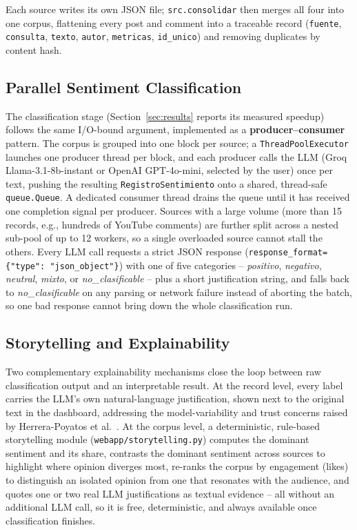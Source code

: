 \documentclass[runningheads]{llncs}
\begin{document}
Each source writes its own JSON file; \texttt{src.consolidar} then merges
all four into one corpus, flattening every post and comment into a
traceable record (\texttt{fuente}, \texttt{consulta}, \texttt{texto},
\texttt{autor}, \texttt{metricas}, \texttt{id\_unico}) and removing
duplicates by content hash.

\subsection{Parallel Sentiment Classification}

The classification stage (Section~\ref{sec:results} reports its measured
speedup) follows the same I/O-bound argument, implemented as a
\textbf{producer--consumer} pattern. The corpus is grouped into one block per
source; a \texttt{ThreadPoolExecutor} launches one producer thread per
block, and each producer calls the LLM (Groq Llama-3.1-8b-instant or OpenAI
GPT-4o-mini, selected by the user) once per text, pushing the resulting
\texttt{RegistroSentimiento} onto a shared, thread-safe \texttt{queue.Queue}.
A dedicated consumer thread drains the queue until it has received one
completion signal per producer. Sources with a large volume (more than 15
records, e.g., hundreds of YouTube comments) are further split across a
nested sub-pool of up to 12 workers, so a single overloaded source cannot
stall the others. Every LLM call requests a strict JSON response
(\texttt{response\_format=\{"type": "json\_object"\}}) with one of five
categories -- \emph{positivo}, \emph{negativo}, \emph{neutral}, \emph{mixto},
or \emph{no\_clasificable} -- plus a short justification string, and falls
back to \emph{no\_clasificable} on any parsing or network failure instead of
aborting the batch, so one bad response cannot bring down the whole
classification run.

\subsection{Storytelling and Explainability}

Two complementary explainability mechanisms close the loop between raw
classification output and an interpretable result. At the record level,
every label carries the LLM's own natural-language justification, shown next
to the original text in the dashboard, addressing the model-variability and
trust concerns raised by Herrera-Poyatos et al.\
\cite{herrerapoyatos2025uncertainty}. At the corpus level, a deterministic,
rule-based storytelling module (\texttt{webapp/storytelling.py}) computes
the dominant sentiment and its share, contrasts the dominant sentiment across
sources to highlight where opinion diverges most, re-ranks the corpus by
engagement (likes) to distinguish an isolated opinion from one that resonates
with the audience, and quotes one or two real LLM justifications as textual
evidence -- all without an additional LLM call, so it is free, deterministic,
and always available once classification finishes.
\end{document}
